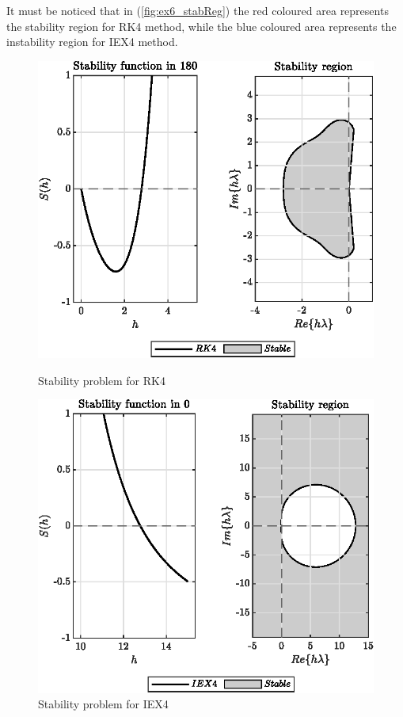 \documentclass[11pt,a4paper,oneside]{article}
\begin{document}
It must be noticed that in (\cref{fig:ex6_stabReg}) the red coloured area represents the stability region for RK4 method, while the blue coloured area represents the instability region for IEX4 method.
\begin{figure}[htb]
    \centering
    \begin{minipage}{0.45\textwidth}
        \centering
        \includegraphics*[width=\textwidth, keepaspectratio]{ex6_rk4.eps}
        \caption[]{\label{fig:ex6_rk4} Stability problem for RK4}
    \end{minipage}
    \hspace{0.05\textwidth}
    \begin{minipage}{0.45\textwidth}
        \centering
        \includegraphics*[width=\textwidth, keepaspectratio]{ex6_iex4.eps}
        \caption[]{\label{fig:ex6_iex4} Stability problem for IEX4}
    \end{minipage}
\end{figure}
\end{document}
